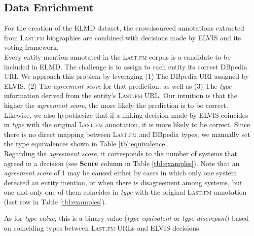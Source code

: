 


\subsection{Data Enrichment}

For the creation of the ELMD dataset, the crowdsourced annotations extracted from \textsc{Last.fm} biographies are combined with decisions made by \textsc{ELVIS} and its voting framework.\\%

Every entity mention annotated in the \textsc{Last.fm} corpus is a candidate to be included in \textsc{ELMD}. The challenge is to assign to each entity its correct DBpedia URI. We approach this problem by leveraging (1) The DBpedia URI assigned by \textsc{ELVIS}, (2) The \textit{agreement score} for that prediction, as well as (3) The \textit{type} information derived from the entity's \textsc{Last.fm} URL. Our intuition is that the higher the \textit{agreement score}, the more likely the prediction is to be correct. Likewise, we also hypothesize that if a linking decision made by \textsc{ELVIS} coincides in \textit{type} with the original \textsc{Last.fm} annotation, it is more likely to be correct. Since there is no direct mapping between \textsc{Last.fm} and DBpedia types, we manually set the type equivalences shown in Table \ref{tbl:equivalence}.\\

Regarding the \textit{agreement score}, it corresponds to the number of systems that agreed in a decision (see \textbf{Score} column in Table \ref{tbl:examples}). Note that an \textit{agreement score} of 1 may be caused either by cases in which only one system detected an entity mention, or when there is disagreement among systems, but one and only one of them coincides in \textit{type} with the original \textsc{Last.fm} annotation (last row in Table \ref{tbl:examples}).

As for \textit{type value}, this is a binary value (\textit{type-equivalent} or \textit{type-discrepant}) based on coinciding types between \textsc{Last.fm} URLs and \textsc{ELVIS} decisions.

